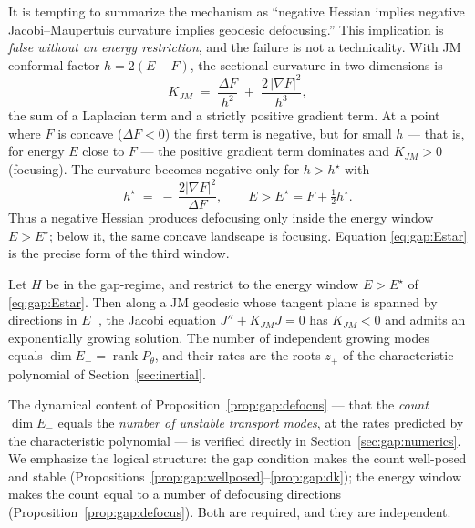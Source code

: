 It is tempting to summarize the mechanism as ``negative Hessian implies
negative Jacobi--Maupertuis curvature implies geodesic defocusing.'' This
implication is \emph{false without an energy restriction}, and the failure is
not a technicality. With JM conformal factor $h=2(E-F)$, the sectional
curvature in two dimensions is
\begin{equation}
  K_{JM} \;=\; \frac{\Delta F}{h^2} \;+\; \frac{2\,|\nabla F|^2}{h^3},
  \label{eq:gap:KJM}
\end{equation}
the sum of a Laplacian term and a strictly positive gradient term. At a point
where $F$ is concave ($\Delta F<0$) the first term is negative, but for small
$h$ --- that is, for energy $E$ close to $F$ --- the positive gradient term
dominates and $K_{JM}>0$ (focusing). The curvature becomes negative only for
$h>h^\star$ with
\begin{equation}
  h^\star \;=\; -\,\frac{2|\nabla F|^2}{\Delta F},
  \qquad
  E > E^\star = F + \tfrac12 h^\star.
  \label{eq:gap:Estar}
\end{equation}
Thus a negative Hessian produces defocusing only inside the energy window
$E>E^\star$; below it, the same concave landscape is focusing. Equation
\eqref{eq:gap:Estar} is the precise form of the third window.

\begin{proposition}
\label{prop:gap:defocus}
Let $H$ be in the gap-regime, and restrict to the energy window $E>E^\star$
of \eqref{eq:gap:Estar}. Then along a JM geodesic whose tangent plane is
spanned by directions in $E_-$, the Jacobi equation $J''+K_{JM}J=0$ has
$K_{JM}<0$ and admits an exponentially growing solution. The number of
independent growing modes equals $\dim E_- = \operatorname{rank}P_\theta$, and
their rates are the roots $z_+$ of the characteristic polynomial of
Section~\ref{sec:inertial}.
\end{proposition}

The dynamical content of Proposition~\ref{prop:gap:defocus} --- that the
\emph{count} $\dim E_-$ equals the \emph{number of unstable transport modes},
at the rates predicted by the characteristic polynomial --- is verified
directly in Section~\ref{sec:gap:numerics}. We emphasize the logical
structure: the gap condition makes the count well-posed and stable
(Propositions~\ref{prop:gap:wellposed}--\ref{prop:gap:dk}); the energy window
makes the count equal to a number of defocusing directions
(Proposition~\ref{prop:gap:defocus}). Both are required, and they are
independent.

